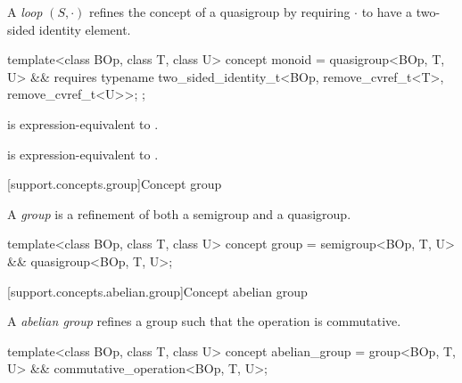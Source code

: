 \pnum
A \textit{loop} $(S, \cdot)$ refines the concept of a quasigroup by requiring $\cdot$ to have a
two-sided identity element.

\begin{itemdecl}
  template<class BOp, class T, class U>
  concept monoid = quasigroup<BOp, T, U> && requires {
    typename two_sided_identity_t<BOp, remove_cvref_t<T>, remove_cvref_t<U>>;
  };
\end{itemdecl}
\begin{itemdescr}
   \pnum
    is expression-equivalent to
   .

   \pnum
    is expression-equivalent to
   .
\end{itemdescr}


[support.concepts.group]{Concept group}

\pnum
A \textit{group} is a refinement of both a semigroup and a quasigroup\cite{wikipedia_group}.

\begin{itemdecl}
  template<class BOp, class T, class U>
  concept group = semigroup<BOp, T, U> && quasigroup<BOp, T, U>;
\end{itemdecl}

[support.concepts.abelian.group]{Concept abelian group}

\pnum
A \textit{abelian group} refines a group such that the operation is
commutative\cite{wikipedia_abelian}.

\begin{itemdecl}
  template<class BOp, class T, class U>
  concept abelian_group = group<BOp, T, U> && commutative_operation<BOp, T, U>;
\end{itemdecl}

